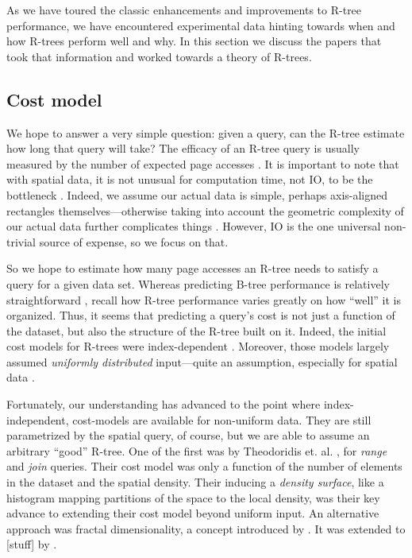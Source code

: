 As we have toured the classic enhancements and improvements to R-tree performance, we have encountered experimental data hinting towards when and how R-trees perform well and why.
In this section we discuss the papers that took that information and worked towards a theory of R-trees.

\subsection{Cost model}
We hope to answer a very simple question: given a query, can the R-tree estimate how long that query will take?
The efficacy of an R-tree query is usually measured by the number of expected page accesses \cite{.....}.
It is important to note that with spatial data, it is not unusual for computation time, not IO, to be the bottleneck \cite{.....}.
Indeed, we assume our actual data is simple, perhaps axis-aligned rectangles themselves---otherwise taking into account the geometric complexity of our actual data further complicates things \cite{aboulnaganaughton00}.
However, IO is the one universal non-trivial source of expense, so we focus on that.

So we hope to estimate how many page accesses an R-tree needs to satisfy a query for a given data set.
Whereas predicting B-tree performance is relatively straightforward \cite{....}, recall how R-tree performance varies greatly on how ``well'' it is organized.
Thus, it seems that predicting a query's cost is not just a function of the dataset, but also the structure of the R-tree built on it.
Indeed, the initial cost models for R-trees were index-dependent \cite{.....}.
Moreover, those models largely assumed \emph{uniformly distributed} input---quite an assumption, especially for spatial data \cite{...}.

Fortunately, our understanding has advanced to the point where index-independent, cost-models are available for non-uniform data.
They are still parametrized by the spatial query, of course, but we are able to assume an arbitrary ``good'' R-tree.
One of the first was by Theodoridis et. al. \cite{theodoridissellis96,theodoridisstefanakissellis00}, for \emph{range} and \emph{join} queries.
Their cost model was only a function of the number of elements in the dataset and the spatial density.
Their inducing a \emph{density surface}, like a histogram mapping partitions of the space to the local density, was their key advance to extending their cost model beyond uniform input.
An alternative approach was fractal dimensionality, a concept introduced by \cite{....}.
It was extended to [stuff] by \cite{...}.

